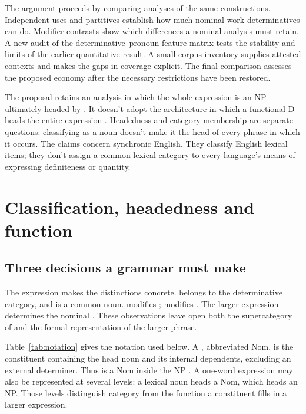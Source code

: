 \documentclass[12pt]{article}
\begin{document}
The argument proceeds by comparing analyses of the same constructions. Independent uses and partitives establish how much nominal work determinatives can do. Modifier contrasts show which differences a nominal analysis must retain. A new audit of the determinative--pronoun feature matrix tests the stability and limits of the earlier quantitative result. A small corpus inventory supplies attested contexts and makes the gaps in coverage explicit. The final comparison assesses the proposed economy after the necessary restrictions have been restored.

The proposal retains an analysis in which the whole expression  is an NP ultimately headed by . It doesn't adopt the architecture in which a functional D heads the entire expression \citep{abney1987}. Headedness and category membership are separate questions: classifying  as a noun doesn't make it the head of every phrase in which it occurs. The claims concern synchronic English. They classify English lexical items; they don't assign a common lexical category to every language's means of expressing definiteness or quantity.

\section{Classification, headedness and function}\label{sec:alternatives}

\subsection{Three decisions a grammar must make}

The expression  makes the distinctions concrete.  belongs to the determinative category, and  is a common noun.  modifies ;  modifies . The larger expression  determines the nominal . These observations leave open both the supercategory of  and the formal representation of the larger phrase.

Table~\ref{tab:notation} gives the notation used below. A , abbreviated Nom, is the constituent containing the head noun and its internal dependents, excluding an external determiner. Thus  is a Nom inside the NP . A one-word expression may also be represented at several levels: a lexical noun heads a Nom, which heads an NP. Those levels distinguish category from the function a constituent fills in a larger expression.
\end{document}
